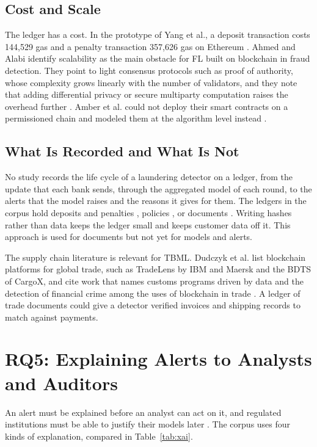 \documentclass[journal]{IEEEtran}
\begin{document}
\subsection{Cost and Scale}

The ledger has a cost. In the prototype of Yang et al., a deposit transaction costs 144{,}529 gas and a penalty transaction 357{,}626 gas on Ethereum \cite{yang2022accountable}. Ahmed and Alabi identify scalability as the main obstacle for FL built on blockchain in fraud detection. They point to light consensus protocols such as proof of authority, whose complexity grows linearly with the number of validators, and they note that adding differential privacy or secure multiparty computation raises the overhead further \cite{ahmed2024bcfl}. Amber et al. could not deploy their smart contracts on a permissioned chain and modeled them at the algorithm level instead \cite{amber2026cbdc}.

\subsection{What Is Recorded and What Is Not}

No study records the life cycle of a laundering detector on a ledger, from the update that each bank sends, through the aggregated model of each round, to the alerts that the model raises and the reasons it gives for them. The ledgers in the corpus hold deposits and penalties \cite{yang2022accountable}, policies \cite{amber2026cbdc}, or documents \cite{cosmin2024notary,chen2024finance}. Writing hashes rather than data keeps the ledger small and keeps customer data off it. This approach is used for documents \cite{cosmin2024notary} but not yet for models and alerts.

The supply chain literature is relevant for TBML. Dudczyk et al. list blockchain platforms for global trade, such as TradeLens by IBM and Maersk and the BDTS of CargoX, and cite work that names customs programs driven by data and the detection of financial crime among the uses of blockchain in trade \cite{dudczyk2024supply}. A ledger of trade documents could give a detector verified invoices and shipping records to match against payments.

\section{RQ5: Explaining Alerts to Analysts and Auditors}
\label{sec:rq5}

An alert must be explained before an analyst can act on it, and regulated institutions must be able to justify their models later \cite{jensen2023fighting,chen2024finance}. The corpus uses four kinds of explanation, compared in Table~\ref{tab:xai}.
\end{document}
